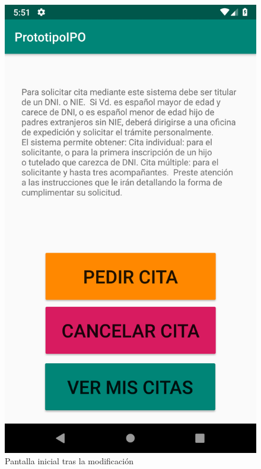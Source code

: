 \documentclass[a4paper,11pt]{article}
\begin{document}
\begin{figure}[H]
\centering
\begin{minipage}{.45\linewidth}
\includegraphics[width=\textwidth]{nuevoinicio.png}
\caption{Pantalla inicial tras la modificación}
\label{nuevoinicio}
\end{minipage}
\begin{minipage}{0.45\linewidth}

\end{minipage}
\end{figure}
\end{document}
